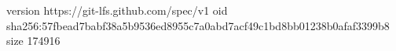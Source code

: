 version https://git-lfs.github.com/spec/v1
oid sha256:57fbead7babf38a5b9536ed8955c7a0abd7acf49c1bd8bb01238b0afaf3399b8
size 174916
